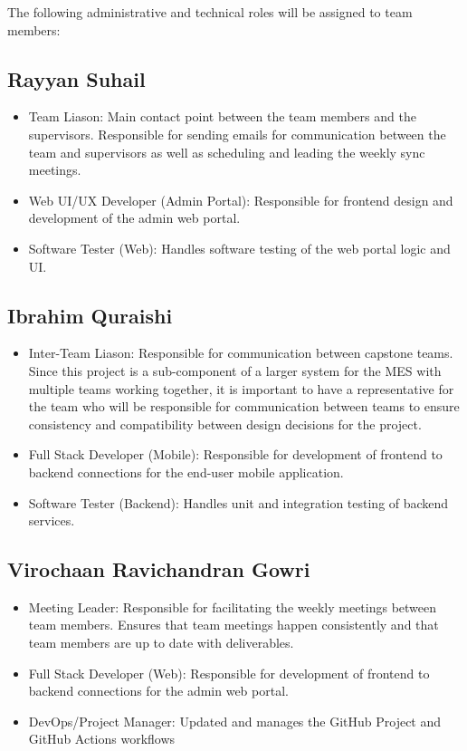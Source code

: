 \documentclass{article}
\begin{document}
\begin{flushleft}
The following administrative and technical roles will be assigned to team members:

\subsection{Rayyan Suhail}
\begin{itemize}
  \item Team Liason: Main contact point between the team members and the supervisors. 
  Responsible for sending emails for communication between the team and supervisors as well as scheduling and leading the weekly sync meetings.
  \item Web UI/UX Developer (Admin Portal): Responsible for frontend design and development of the admin web portal.
  \item Software Tester (Web): Handles software testing of the web portal logic and UI.
\end{itemize}

\subsection{Ibrahim Quraishi}
\begin{itemize}
  \item Inter-Team Liason: Responsible for communication between capstone teams. 
  Since this project is a sub-component of a larger system for the MES with multiple teams working together, it is important to have a representative for the team who will be responsible for communication between teams to ensure consistency and compatibility between design decisions for the project.
  \item Full Stack Developer (Mobile): Responsible for development of frontend to backend connections for the end-user mobile application.
  \item Software Tester (Backend): Handles unit and integration testing of backend services.
\end{itemize}

\subsection{Virochaan Ravichandran Gowri}
\begin{itemize}
  \item Meeting Leader: Responsible for facilitating the weekly meetings between team members. 
  Ensures that team meetings happen consistently and that team members are up to date with deliverables.
  \item Full Stack Developer (Web): Responsible for development of frontend to backend connections for the admin web portal.
  \item DevOps/Project Manager: Updated and manages the GitHub Project and GitHub Actions workflows
\end{itemize}


\end{flushleft}
\end{document}
